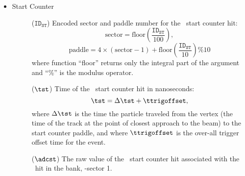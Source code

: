 \begin{itemize}
\begin{description}
    \end{description}
    \item Start Counter
    \begin{description}
        \item[] ($\mathtt{ID}_\mathtt{ST}$) Encoded sector and paddle number for the \ith\ start counter hit:
        \[
            \mathrm{sector} = \mathrm{floor}\left(\frac{\mathtt{ID}_\mathtt{ST}}{100}\right),
        \]
        \[
            \mathrm{paddle} = 4 \times \left(\mathrm{sector} - 1\right) + \mathrm{floor}\left(\frac{\mathtt{ID}_\mathtt{ST}}{10}\right) \% 10
        \]
        where function ``floor'' returns only the integral part of the argument and ``\%'' is the modulus operator.
        \item[] ($\tst$) Time of the \ith\ start counter hit in nanoseconds:
        \[
            \tst = \Delta\tst + \ttrigoffset,
        \]
        where $\Delta\tst$ is the time the particle traveled from the vertex (the time of the track at the point of closest approach to the beam) to the start counter paddle, and where $\ttrigoffset$ is the over-all trigger offset time for the event.
        \item[] ($\adcst$) The raw  value of the \ith\ start counter hit associated with the \ith\ hit in the  bank, -sector 1.
    \end{description}
\end{itemize}
